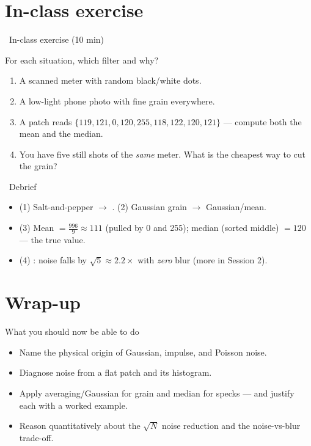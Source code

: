 \documentclass[10pt,aspectratio=169]{beamer}
\begin{document}
\section{In-class exercise}

\begin{frame}{\faPen~In-class exercise (10 min)}
  \begin{infobox}
  \end{infobox}
  For each situation, which filter and why?
  \begin{enumerate}
    \item A scanned meter with random black/white dots.
    \item A low-light phone photo with fine grain everywhere.
    \item A patch reads $\{119,121,0,120,255,118,122,120,121\}$ — compute both the mean and the median.
    \item You have five still shots of the \emph{same} meter. What is the cheapest way to cut the grain?
  \end{enumerate}
\end{frame}

\begin{frame}{\faPen~Debrief}
  \begin{itemize}
    \item (1) Salt-and-pepper $\rightarrow$ . (2) Gaussian grain $\rightarrow$ Gaussian/mean.
    \item (3) Mean $=\frac{996}{9}\approx111$ (pulled by 0 and 255); median (sorted middle) $=120$ — the true value.
    \item (4) : noise falls by $\sqrt{5}\approx2.2\times$ with \emph{zero} blur (more in Session 2).
  \end{itemize}
\end{frame}

\section{Wrap-up}

\begin{frame}{What you should now be able to do}
  \begin{itemize}
    \item Name the physical origin of Gaussian, impulse, and Poisson noise.
    \item Diagnose noise from a flat patch and its histogram.
    \item Apply averaging/Gaussian for grain and median for specks — and justify each with a worked example.
    \item Reason quantitatively about the $\sqrt{N}$ noise reduction and the noise-vs-blur trade-off.
  \end{itemize}
\end{frame}
\end{document}
